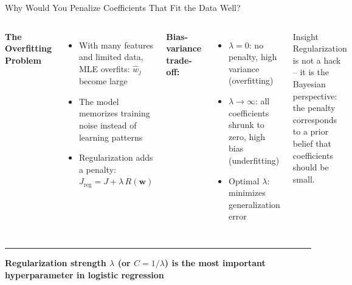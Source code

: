 \documentclass[8pt,aspectratio=169]{beamer}
\newcommand{\bottomnote}[1]{%
\vfill
\vspace{-2mm}
\textcolor{mllavender2}{\rule{\textwidth}{0.4pt}}
\vspace{1mm}
\footnotesize
\textbf{#1}
}
\newenvironment{compactlist}{%
  \begin{itemize}%
    \setlength{\itemsep}{2pt}%
    \setlength{\parskip}{0pt}%
    \setlength{\parsep}{0pt}%
}{%
  \end{itemize}%
}
\begin{document}

\begin{frame}[t]{Why Would You Penalize Coefficients That Fit the Data Well?}
\begin{columns}[T]
\small
\textbf{The Overfitting Problem}

\begin{compactlist}
\item With many features and limited data, MLE overfits: $\hat{w}_j$ become large
\item The model memorizes training noise instead of learning patterns
\item Regularization adds a penalty: $J_{\text{reg}} = J + \lambda\,R(\mathbf{w})$
\end{compactlist}

\vspace{1mm}
\scriptsize
\textbf{Bias-variance trade-off:}
\begin{compactlist}
\item $\lambda = 0$: no penalty, high variance (overfitting)
\item $\lambda \to \infty$: all coefficients shrunk to zero, high bias (underfitting)
\item Optimal $\lambda$: minimizes generalization error
\end{compactlist}

\begin{block}{Insight}
\scriptsize Regularization is not a hack -- it is the Bayesian perspective: the penalty corresponds to a prior belief that coefficients should be small.
\end{block}

\footnotesize
\vspace{4mm}
\end{columns}

\bottomnote{Regularization strength $\lambda$ (or $C=1/\lambda$) is the most important hyperparameter in logistic regression}
\end{frame}
\end{document}
